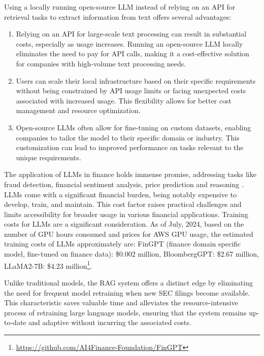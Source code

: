 Using a locally running open-source LLM instead of relying on an API for retrieval tasks to extract information from text offers several advantages:
\begin{enumerate}
\item Relying on an API for large-scale text processing can result in substantial costs, especially as usage increases. Running an open-source LLM locally eliminates the need to pay for API calls, making it a cost-effective solution for companies with high-volume text processing needs.
\item Users can scale their local infrastructure based on their specific requirements without being constrained by API usage limits or facing unexpected costs associated with increased usage. This flexibility allows for better cost management and resource optimization.
\item Open-source LLMs often allow for fine-tuning on custom datasets, enabling companies to tailor the model to their specific domain or industry. This customization can lead to improved performance on tasks relevant to the unique requirements.
\end{enumerate}

The application of LLMs in finance holds immense promise, addressing tasks like fraud detection, financial sentiment analysis, price prediction and reasoning \cite{Li.28Sep2023}. LLMs come with a significant financial burden, being notably expensive to develop, train, and maintain. This cost factor raises practical challenges and limits accessibility for broader usage in various financial applications. Training costs for LLMs are a significant consideration. As of July, 2024, based on the number of GPU hours consumed and prices for AWS GPU usage, the estimated training costs of LLMs approximately are: FinGPT (finance domain specific model, fine-tuned on finance data): \$0.002 million, BloombergGPT: \$2.67 million, LLaMA2-7B: \$4.23 million\footnote{\url{https://github.com/AI4Finance-Foundation/FinGPT}}. 

Unlike traditional models, the RAG system offers a distinct edge by eliminating the need for frequent model retraining when new SEC filings become available. This characteristic saves valuable time and alleviates the resource-intensive process of retraining large language models, ensuring that the system remains up-to-date and adaptive without incurring the associated costs.

